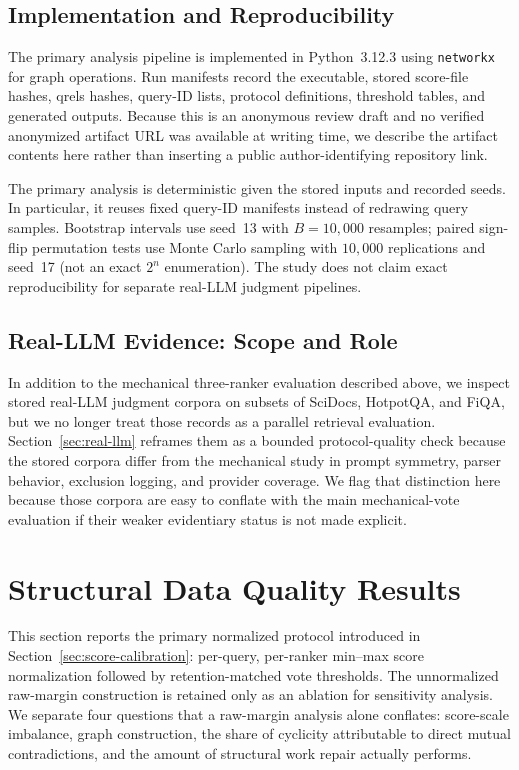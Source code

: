 \documentclass[manuscript,anonymous,review]{acmart}
\begin{document}
\subsection{Implementation and Reproducibility}
\label{sec:implementation}

The primary analysis pipeline is implemented in Python~3.12.3 using
\texttt{networkx} for graph operations. Run manifests record the executable,
stored score-file hashes, qrels hashes, query-ID lists, protocol definitions,
threshold tables, and generated outputs. Because this is an anonymous review
draft and no verified anonymized artifact URL was available at writing time,
we describe the artifact contents here rather than inserting a public
author-identifying repository link.

The primary analysis is deterministic given the stored inputs and recorded
seeds. In particular, it reuses fixed query-ID manifests instead of redrawing
query samples. Bootstrap intervals use seed~13 with $B=10{,}000$ resamples;
paired sign-flip permutation tests use Monte Carlo sampling with $10{,}000$
replications and seed~17 (not an exact $2^n$ enumeration). The study does not
claim exact reproducibility for separate real-LLM judgment pipelines.

\subsection{Real-LLM Evidence: Scope and Role}
\label{sec:real-llm-scope}

In addition to the mechanical three-ranker evaluation described above, we
inspect stored real-LLM judgment corpora on subsets of SciDocs, HotpotQA, and
FiQA, but we no longer treat those records as a parallel retrieval evaluation.
Section~\ref{sec:real-llm} reframes them as a bounded protocol-quality check
because the stored corpora differ from the mechanical study in prompt symmetry,
parser behavior, exclusion logging, and provider coverage. We flag that distinction here because those corpora are easy to
conflate with the main mechanical-vote evaluation if their weaker evidentiary
status is not made explicit.

\section{Structural Data Quality Results}
\label{sec:structural-results}

This section reports the primary normalized protocol introduced in
Section~\ref{sec:score-calibration}: per-query, per-ranker min--max score
normalization followed by retention-matched vote thresholds. The unnormalized
raw-margin construction is retained only as an ablation for sensitivity
analysis. We separate four questions that a raw-margin analysis alone
conflates: score-scale imbalance, graph construction, the share of cyclicity
attributable to direct mutual contradictions, and the amount of structural
work repair actually performs.
\end{document}
